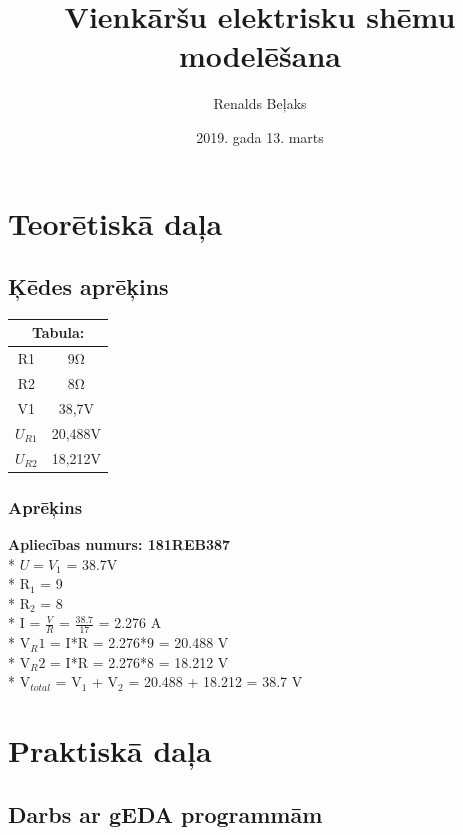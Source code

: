 \documentclass {report}
\title{Vienkāršu elektrisku shēmu modelēšana}
\author{Renalds Beļaks}
\date{2019. gada 13. marts}
\begin{document}
\maketitle
\chapter{Teorētiskā daļa}
\section{Ķēdes aprēķins}

\begin{center}
\small\addtolength{\tabcolsep}{10pt}
\begin{tabular}{|c|c|}
    \hline \multicolumn{2}{|c|}{Tabula:} \\
\hline
R1 & 9Ω\\
\hline
R2 & 8Ω\\
\hline
V1 & 38,7V\\
\hline
$U_{R1}$ & 20,488V\\
\hline
$U_{R2}$ & 18,212V\\
\hline
\end{tabular}
\end{center}
\subsection{Aprēķins}
\textbf{Apliecības numurs: 181REB387}\\
* $U=V_{1}$ = 38.7V\\
* R$_{1}$ = 9\\
* R$_{2}$ = 8\\
* I = \( \frac{V}{R} \) = \( \frac{38.7}{17}\) = 2.276 A\\
* V$_{R}{1}$ = I*R = 2.276*9 = 20.488 V\\
* V$_{R}{2}$ = I*R = 2.276*8 = 18.212 V\\
* V$_{total}$ = V$_{1}$ + V$_{2}$ = 20.488 + 18.212 = 38.7 V\\

\chapter{Praktiskā daļa}
\section{Darbs ar gEDA programmām}
\end{document}
